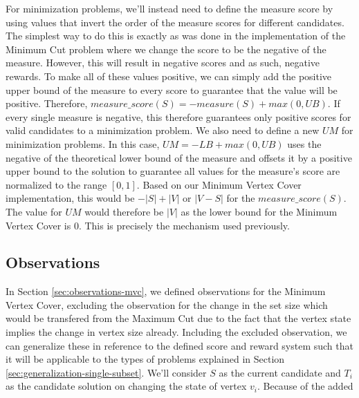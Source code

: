 \documentclass{article}
\begin{document}
For minimization problems, we'll instead need to define the measure score by using values that invert the order of the measure scores for different candidates. The simplest way to do this is exactly as was done in the implementation of the Minimum Cut problem where we change the score to be the negative of the measure. However, this will result in negative scores and as such, negative rewards. To make all of these values positive, we can simply add the positive upper bound of the measure to every score to guarantee that the value will be positive. Therefore, $measure\_score(S) = - measure(S) + max(0, UB)$. If every single measure is negative, this therefore guarantees only positive scores for valid candidates to a minimization problem. We also need to define a new $UM$ for minimization problems. In this case, $UM = - LB + max(0, UB)$ uses the negative of the theoretical lower bound of the measure and offsets it by a positive upper bound to the solution to guarantee all values for the measure's score are normalized to the range $[0, 1]$. Based on our Minimum Vertex Cover implementation, this would be $- |S| + |V|$ or $|V - S|$ for the $measure\_score(S)$. The value for $UM$ would therefore be $|V|$ as the lower bound for the Minimum Vertex Cover is $0$. This is precisely the mechanism used previously.

\subsection{Observations}\label{sec:observations-generalized}

In Section \ref{sec:observations-mvc}, we defined observations for the Minimum Vertex Cover, excluding the observation for the change in the set size which would be transfered from the Maximum Cut due to the fact that the vertex state implies the change in vertex size already. Including the excluded observation, we can generalize these in reference to the defined score and reward system such that it will be applicable to the types of problems explained in Section \ref{sec:generalization-single-subset}. We'll consider $S$ as the current candidate and $T_i$ as the candidate solution on changing the state of vertex $v_i$. Because of the added 
\end{document}
